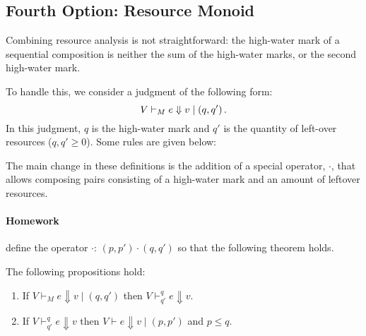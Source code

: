 \documentclass[ manuscript,screen, nonacm]{acmart}
\begin{document}
\subsection{Fourth Option: Resource Monoid}
Combining resource analysis is not straightforward: the high-water mark of a sequential
composition is neither the sum of the high-water marks, or the second high-water
mark.

To handle this, we consider a judgment of the following form:
\[
V \vdash_{M} e \Downarrow v \mid \left(q,q'\right).
\]
In this judgment, $q$ is the high-water mark and $q'$ is the quantity of left-over resources ($q, q' \geq 0$). Some rules are given below:

The main change in these definitions is the addition of a special operator, \(\cdot\), that
allows composing pairs consisting of a high-water mark and an amount of leftover resources.

\paragraph{Homework} define the operator $\cdot$: $(p,p') \cdot (q,q')$ so that the following theorem holds.

\begin{theorem}
The following propositions hold:
\begin{enumerate}
    \item If $V\vdash_M e \Downarrow v \mid (q, q')$ then $V\vdash_{q'}^q e \Downarrow v $.
    \item If $V\vdash_{q'}^q e \Downarrow v$ then $V \vdash e \Downarrow v \mid (p, p')$ and $p\leq q$.
\end{enumerate}
  
\end{theorem}
\end{document}
